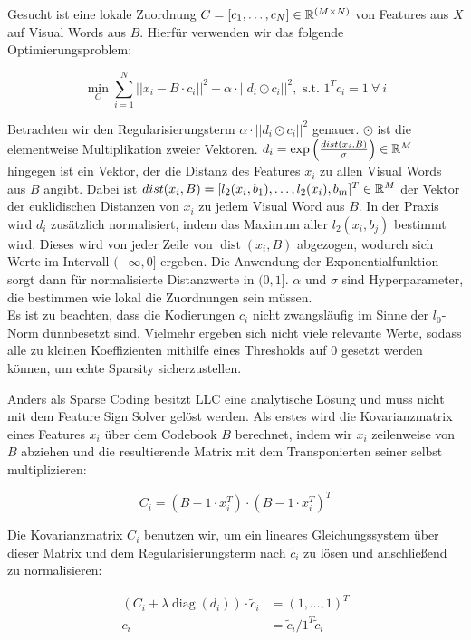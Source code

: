 Gesucht ist eine lokale Zuordnung $C = [c_1, \dots, c_N] \in \mathbb{R}^{(M \times N)}$ von Features aus $X$ auf Visual Words aus $B$. Hierfür verwenden wir das folgende Optimierungsproblem:

\begin{equation}
\min_C \sum_{i=1}^{N} ||x_i - B\cdot c_i||^2 + \alpha\cdot ||d_i \odot c_i||^2, \text{ s.t. } 1^Tc_i = 1 \: \forall \: i
\end{equation}

Betrachten wir den Regularisierungsterm $\alpha\cdot ||d_i \odot c_i||^2$ genauer. $\odot$ ist die elementweise Multiplikation zweier Vektoren. $d_i = \exp \left( \frac{ \mathop{dist}(x_i, B)}{\sigma} \right) \in \mathbb{R}^{M}$ hingegen ist ein Vektor, der die Distanz des Features $x_i$ zu allen Visual Words aus $B$ angibt. Dabei ist $\mathop{dist}(x_i, B) = [l_2(x_i, b_1), \dots, l_2(x_i), b_m]^T \in \mathbb{R}^M$ der Vektor der euklidischen Distanzen von $x_i$ zu jedem Visual Word aus $B$. In der Praxis wird $d_i$ zusätzlich normalisiert, indem das Maximum aller $l_2(x_i, b_j)$ bestimmt wird. Dieses wird von jeder Zeile von $\mathop{dist}(x_i, B)$ abgezogen, wodurch sich Werte im Intervall $(-\infty, 0]$ ergeben. Die Anwendung der Exponentialfunktion sorgt dann für normalisierte Distanzwerte in $(0, 1]$. $\alpha$ und $\sigma$ sind Hyperparameter, die bestimmen wie lokal die Zuordnungen sein müssen. \\
Es ist zu beachten, dass die Kodierungen $c_i$ nicht zwangsläufig im Sinne der $l_0$-Norm dünnbesetzt sind. Vielmehr ergeben sich nicht viele relevante Werte, sodass alle zu kleinen Koeffizienten mithilfe eines Thresholds auf 0 gesetzt werden können, um echte Sparsity sicherzustellen. 

Anders als Sparse Coding besitzt LLC eine analytische Lösung und muss nicht mit dem Feature Sign Solver gelöst werden. Als erstes wird die Kovarianzmatrix eines Features $x_i$ über dem Codebook $B$ berechnet, indem wir $x_i$ zeilenweise von $B$ abziehen und die resultierende Matrix mit dem Transponierten seiner selbst multiplizieren:

\begin{equation}
	C_i = (B - 1\cdot x_i^T)\cdot (B - 1\cdot x_i^T)^T
\end{equation}

Die Kovarianzmatrix $C_i$ benutzen wir, um ein lineares Gleichungssystem über dieser Matrix und dem Regularisierungsterm nach $\tilde{c}_i$ zu lösen und anschließend zu normalisieren:

\begin{align}
	(C_i + \lambda\mathop{diag}(d_i)) \cdot \tilde{c}_i &= (1, \dots, 1)^T \\
	c_i &= \tilde{c}_i / 1^T\tilde{c}_i
\end{align}

